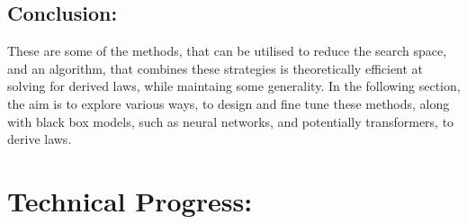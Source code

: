 \documentclass{article}
\begin{document}

















\subsection{ Conclusion: }

These are some of the methods, that can be utilised to reduce the search space, and an algorithm, that combines these strategies is theoretically efficient at solving for derived laws, while maintaing some generality. In the following section, the aim is to explore various ways, to design and fine tune these methods, along with black box models, such as neural networks, and potentially transformers, to derive laws. \\ 





\section{Technical Progress: }
\end{document}
